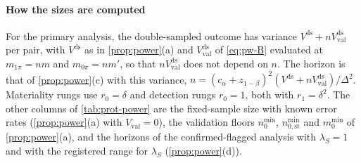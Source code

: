 \paragraph{How the sizes are computed}
For the primary analysis, the double-sampled outcome has variance $V^{\mathrm{ds}}+nV_{\mathrm{val}}^{\mathrm{ds}}$ per pair, with $V^{\mathrm{ds}}$ as in \cref{prop:power}(a) and $V_{\mathrm{val}}^{\mathrm{ds}}$ of \eqref{eq:pw-B} evaluated at $m_{1\pi}=nm$ and $m_{0\pi}=nm'$, so that $nV_{\mathrm{val}}^{\mathrm{ds}}$ does not depend on $n$. The horizon is that of \cref{prop:power}(c) with this variance, $n=(c_\alpha+z_{1-\beta})^2(V^{\mathrm{ds}}+nV_{\mathrm{val}}^{\mathrm{ds}})/\Delta^2$. Materiality rungs use $r_0=\delta$ and detection rungs $r_0=1$, both with $r_1=\delta^2$. The other columns of \cref{tab:prot-power} are the fixed-sample size with known error rates (\cref{prop:power}(a) with $V_{\mathrm{val}}=0$), the validation floors $n_0^{\min}$, $n^{\min}_{0,\mathrm{st}}$ and $m_0^{\min}$ of \cref{prop:power}(a), and the horizons of the confirmed-flagged analysis with $\lambda_S=1$ and with the registered range for $\lambda_S$ (\cref{prop:power}(d)).


